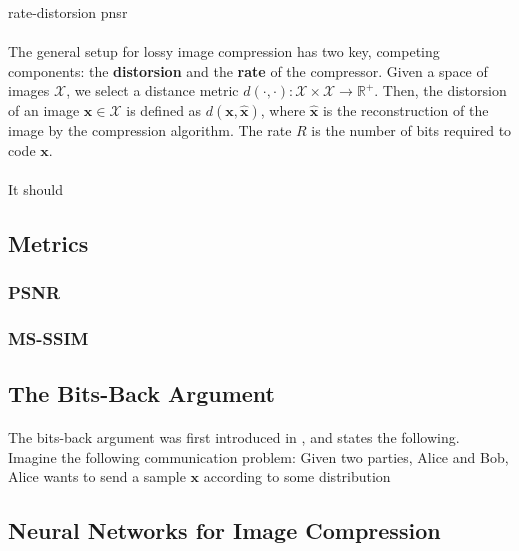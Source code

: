 \documentclass{article}
\renewcommand{\vec}[1]{\mathbf{#1}}
\newcommand{\ImSpace}{\mathcal{X}}
\newcommand{\Reals}{\mathbb{R}}
\begin{document}
rate-distorsion
pnsr
\paragraph{}
The general setup for lossy image compression has two key, competing components:
the \textbf{distorsion} and the \textbf{rate} of the compressor. Given a space
of images $\ImSpace$, we select a distance metric $d(\cdot, \cdot): \ImSpace
\times \ImSpace \rightarrow \Reals^+$. Then, the distorsion of an image $\vec{x}
\in \ImSpace$ is defined as $d(\vec{x}, \hat{\vec{x}})$, where $\hat{\vec{x}}$
is the reconstruction of the image by the compression algorithm. The rate $R$
is the number of bits required to code $\vec{x}$.
\paragraph{}
It should 

\cite{psnr}
\cite{msssim}
\subsection{Metrics}
\paragraph{}
\subsubsection{PSNR}
\subsubsection{MS-SSIM}
\subsection{The Bits-Back Argument}
\paragraph{}
The bits-back argument was first introduced in \cite{hinton1993keeping}, and states
the following. Imagine the following communication problem: Given two parties,
Alice and Bob, Alice wants to send a sample $\vec{x}$ according to some
distribution 

\subsection{Neural Networks for Image Compression}
\paragraph{}
\end{document}
